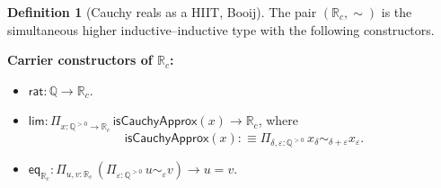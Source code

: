 \documentclass[12pt]{article}
\theoremstyle{definition}
\newtheorem{definition}[theorem]{Definition}
\theoremstyle{remark}
\newcommand{\Q}{\mathbb{Q}}
\newcommand{\Rc}{\mathbb{R}_{c}}
\newcommand{\rat}{\mathsf{rat}}
\newcommand{\hlim}{\mathsf{lim}}
\newcommand{\close}{\mathrel{\sim}}
\begin{document}
\begin{definition}[Cauchy reals as a HIIT, Booij]
\label{def:Rc-book}
The pair $(\Rc, \close)$ is the simultaneous higher
inductive--inductive type with the following constructors.

\textbf{Carrier constructors of $\Rc$:}
\begin{itemize}
\item $\rat : \Q \to \Rc$.
\item $\hlim : \Pi_{x : \Q^{>0} \to \Rc}\,
       \mathsf{isCauchyApprox}(x) \to \Rc$, where
\[
\mathsf{isCauchyApprox}(x) :\equiv
\Pi_{\delta, \varepsilon : \Q^{>0}}\,
   x_{\delta} \close_{\delta + \varepsilon} x_{\varepsilon}.
\]
\item $\mathsf{eq}_{\Rc} : \Pi_{u, v : \Rc}\,
        (\Pi_{\varepsilon : \Q^{>0}}\, u \close_{\varepsilon} v) \to u = v$.
\end{itemize}


\end{definition}
\end{document}
